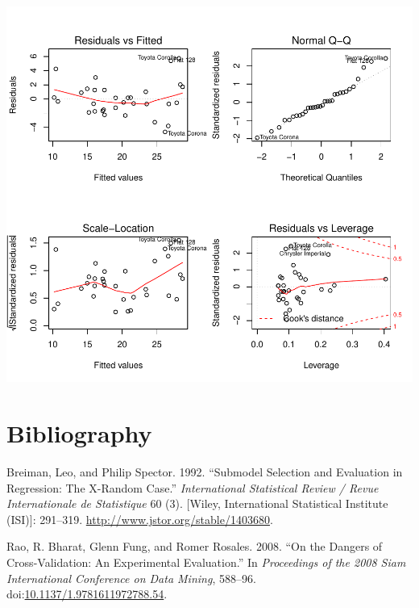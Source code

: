 \documentclass[]{article}
\let\origfigure\figure
\let\endorigfigure\endfigure
\renewenvironment{figure}[1][2] {
    \expandafter\origfigure\expandafter[H]
} {
    \endorigfigure
}
\begin{document}
\begin{figure}[htbp]
\centering
\includegraphics{Regression_Models_Course_Project_files/figure-latex/diagnostics_best_overall_model-1.pdf}
\caption{Diagnostic Plots - Best Overall (Unconstrained) Model}
\end{figure}

\section*{Bibliography}\label{bibliography}

\hypertarget{refs}{}
\hypertarget{ref-BreimanSubmodelSelection1992}{}
Breiman, Leo, and Philip Spector. 1992. ``Submodel Selection and
Evaluation in Regression: The X-Random Case.'' \emph{International
Statistical Review / Revue Internationale de Statistique} 60 (3).
{[}Wiley, International Statistical Institute (ISI){]}: 291--319.
\url{http://www.jstor.org/stable/1403680}.

\hypertarget{ref-RaoDangersCV2008}{}
Rao, R. Bharat, Glenn Fung, and Romer Rosales. 2008. ``On the Dangers of
Cross-Validation: An Experimental Evaluation.'' In \emph{Proceedings of
the 2008 Siam International Conference on Data Mining}, 588--96.
doi:\href{https://doi.org/10.1137/1.9781611972788.54}{10.1137/1.9781611972788.54}.
\end{document}
